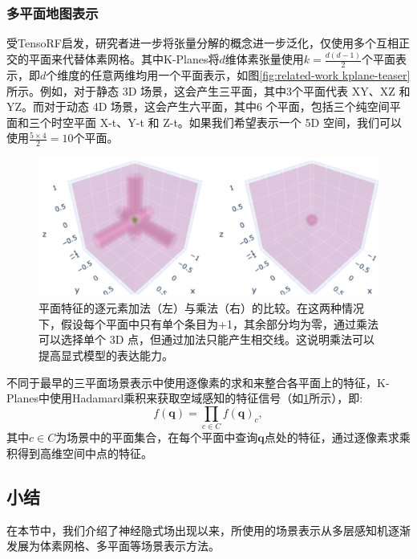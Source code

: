 \subsubsection{多平面地图表示}
受TensoRF启发，研究者进一步将张量分解的概念进一步泛化，仅使用多个互相正交的平面来代替体素网格\cite{fridovich-keil_k-planes_2023, cao_hexplane_2023, reiser_merf_2023, chan_efficient_2022}。其中K-Planes\cite{fridovich-keil_k-planes_2023}将$d$维体素张量使用$k=\frac{d(d-1)}{2}$个平面表示，即$d$个维度的任意两维均用一个平面表示，如图\ref{fig:related-work kplane-teaser}所示。例如，对于静态 3D 场景，这会产生三平面，其中3个平面代表 XY、XZ 和 YZ。而对于动态 4D 场景，这会产生六平面，其中6 个平面，包括三个纯空间平面和三个时空平面 X-t、Y-t 和 Z-t。如果我们希望表示一个 5D 空间，我们可以使用$\frac{5\times4}{2}=10$个平面。


\begin{figure}[h]
    \centering
    \includegraphics[width=\textwidth]{undergraduate-thesis/images/related-work/hadamard-product.png}
    \caption{平面特征的逐元素加法（左）与乘法（右）的比较。在这两种情况下，假设每个平面中只有单个条目为+1，其余部分均为零，通过乘法可以选择单个 3D 点，但通过加法只能产生相交线。这说明乘法可以提高显式模型的表达能力\cite{fridovich-keil_k-planes_2023}。}
    \label{fig:related-work hadamard-product}
\end{figure}

不同于最早的三平面场景表示\cite{chan_efficient_2022}中使用逐像素的求和来整合各平面上的特征，K-Planes中使用Hadamard乘积来获取空域感知的特征信号（如\ref{fig:related-work hadamard-product}所示），即:
\begin{equation}
    f(\mathbf{q}) = \prod_{c\in C}f(\mathbf{q})_c,
\end{equation}
其中$c\in C$为场景中的平面集合，在每个平面中查询$\mathbf{q}$点处的特征，通过逐像素求乘积得到高维空间中点的特征。

\subsection{小结}
在本节中，我们介绍了神经隐式场出现以来，所使用的场景表示从多层感知机\cite{mildenhall_nerf_2020,park_deepsdf_2019, mescheder_occupancy_2019, shim_snerl_2023, zhi_-place_2021}逐渐发展为体素网格\cite{fridovich-keil_plenoxels_2022,yu_monosdf_2022,muller_instant_2022,jiang_instantavatar_2022}、多平面\cite{chen_tensorf_2022,fridovich-keil_k-planes_2023,cao_hexplane_2023}等场景表示方法。

